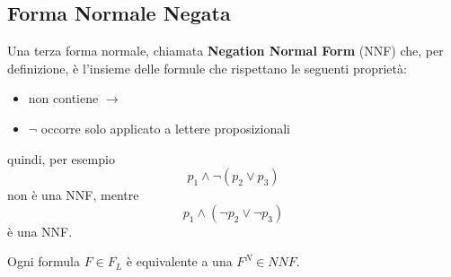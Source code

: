 \subsection{Forma Normale Negata}
Una terza forma normale, chiamata \textbf{Negation 
Normal Form} (NNF) che, per definizione, è l'insieme delle formule 
che rispettano le seguenti proprietà: 
\begin{itemize}
  \item non contiene $\rightarrow$ 
  \item $\neg$ occorre solo applicato a lettere proposizionali
\end{itemize}
quindi, per esempio 
$$ 
p_1 \land \neg(p_2 \lor p_3)
$$
non è una NNF, mentre 
$$
p_1 \land (\neg p_2 \lor \neg p_3)
$$
è una NNF. 
\begin{lem}
Ogni formula $F \in F_L$ è equivalente a una $F^{N} \in NNF$. 
\end{lem}
